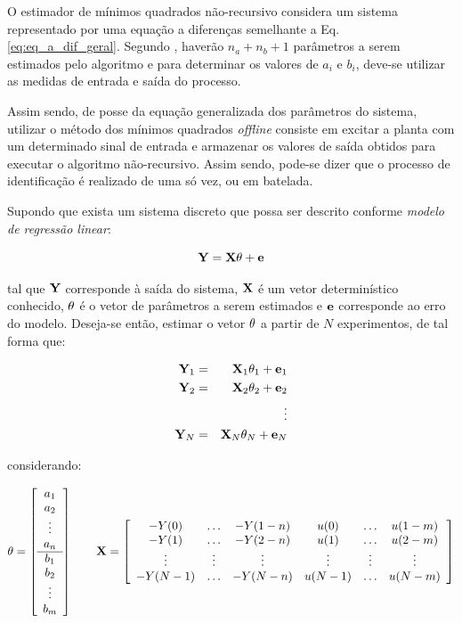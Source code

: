 O estimador de mínimos quadrados não-recursivo considera um sistema representado
por uma equação a diferenças semelhante a Eq. \ref{eq:eq_a_dif_geral}. Segundo
, haverão $n_a + n_b + 1$ parâmetros a serem estimados
pelo algoritmo e para determinar os valores de $a_i$ e $b_i$, deve-se utilizar
as medidas de entrada e saída do processo.

Assim sendo, de posse da equação generalizada dos parâmetros do sistema,
utilizar o método dos mínimos quadrados {\it offline} consiste em excitar a
planta com um determinado sinal de entrada e armazenar os valores de saída
obtidos para executar o algoritmo não-recursivo. Assim sendo, pode-se dizer que
o processo de identificação é realizado de uma só vez, ou em batelada.

Supondo que exista um sistema discreto que possa ser descrito conforme {\it
modelo de regressão linear}:

\begin{equation}\label{eq:mode_reg_lin}
\mathbf{Y} = \mathbf{X\theta} + \mathbf{e}
\end{equation}

\noindent tal que $\mathbf{Y}$ corresponde à saída do sistema, $\mathbf{X}$ é um vetor
determinístico conhecido, $\mathbf{\theta}$ é o vetor de parâmetros a serem
estimados e $\mathbf{e}$ corresponde ao erro do modelo. Deseja-se então, estimar o
vetor $\mathbf{\theta}$ a partir de $N$ experimentos, de tal forma que:

\begin{eqnarray}
\mathbf{Y}_1 & = & \mathbf{X}_1\mathbf{\theta}_1 + \mathbf{e}_1\nonumber\\
\mathbf{Y}_2 & = & \mathbf{X}_2\mathbf{\theta}_2 + \mathbf{e}_2\nonumber\\
& & \vdots\nonumber\\ 
\mathbf{Y}_N & = & \mathbf{X}_N\mathbf{\theta}_N + \mathbf{e}_N\nonumber
\end{eqnarray}

\noindent considerando:

\begin{equation*}
\mathbf{\theta} = \left[
\begin{array}{c}
a_1\\
a_2\\
\vdots\\
a_n\\
\hline
b_1\\
b_2\\
\vdots\\
b_m
\end{array}
\right] \qquad
\mathbf{X} = \left[
\begin{array}{cccccc}
-Y(0) & \ldots & -Y(1-n) & u(0) & \ldots & u(1-m)\\
-Y(1) & \ldots & -Y(2-n) & u(1) & \ldots & u(2-m)\\
\vdots & \vdots & \vdots & \vdots & \vdots & \vdots\\
-Y(N-1) & \ldots & -Y(N-n) & u(N-1) & \ldots & u(N-m)
\end{array}
\right]
\end{equation*}

